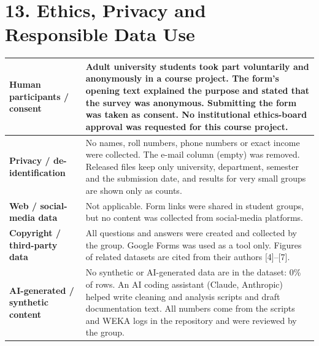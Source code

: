 \documentclass[11pt,a4paper]{article}
\newcommand{\hd}[1]{\textbf{#1}}
\begin{document}
\section{13. Ethics, Privacy and Responsible Data Use}
{\small
\begin{tabularx}{\linewidth}{|L{55mm}|Y|}
\hline
\hd{Human participants / consent} & Adult university students took part voluntarily and anonymously in a course project. The form's opening text explained the purpose and stated that the survey was anonymous. Submitting the form was taken as consent. No institutional ethics-board approval was requested for this course project. \\ \hline
\hd{Privacy / de-identification} & No names, roll numbers, phone numbers or exact income were collected. The e-mail column (empty) was removed. Released files keep only university, department, semester and the submission date, and results for very small groups are shown only as counts. \\ \hline
\hd{Web / social-media data} & Not applicable. Form links were shared in student groups, but no content was collected from social-media platforms. \\ \hline
\hd{Copyright / third-party data} & All questions and answers were created and collected by the group. Google Forms was used as a tool only. Figures of related datasets are cited from their authors [4]--[7]. \\ \hline
\hd{AI-generated / synthetic content} & No synthetic or AI-generated data are in the dataset: 0\% of rows. An AI coding assistant (Claude, Anthropic) helped write cleaning and analysis scripts and draft documentation text. All numbers come from the scripts and WEKA logs in the repository and were reviewed by the group. \\ \hline
\end{tabularx}}

\end{document}
